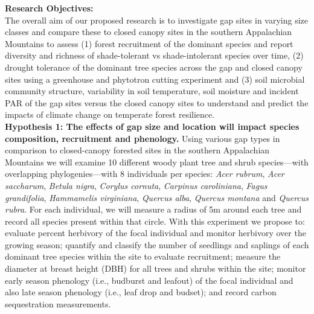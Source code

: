 \documentclass[11pt]{article}\usepackage[]{graphicx}\usepackage[]{color}
\begin{document}
{\noindent\Large\textbf{Research Objectives:}}\\
The overall aim of our proposed research is to investigate gap sites in varying size classes and compare these to closed canopy sites in the southern Appalachian Mountains to assess (1) forest recruitment of the dominant species and report diversity and richness of shade-tolerant vs shade-intolerant species over time, (2) drought tolerance of the dominant tree species across the gap and closed canopy sites using a greenhouse and phytotron cutting experiment and (3) soil microbial community structure, variability in soil temperature, soil moisture and incident PAR of the gap sites versus the closed canopy sites to understand and predict the impacts of climate change on temperate forest resilience.\\

\textbf{Hypothesis 1: The effects of gap size and location will impact species composition, recruitment and phenology.} Using various gap types in comparison to closed-canopy forested sites in the southern Appalachian Mountains we will examine 10 different woody plant tree and shrub species---with overlapping phylogenies---with 8 individuals per species: \textit{Acer rubrum}, \textit{Acer saccharum}, \textit{Betula nigra}, \textit{Corylus cornuta}, \textit{Carpinus caroliniana}, \textit{Fagus grandifolia}, \textit{Hammamelis virginiana}, \textit{Quercus alba}, \textit{Quercus montana} and \textit{Quercus rubra}. For each individual, we will measure a radius of 5m around each tree and record all species present within that circle. With this experiment we propose to: evaluate percent herbivory of the focal individual and monitor herbivory over the growing season; quantify and classify the number of seedlings and saplings of each dominant tree species within the site to evaluate recruitment; measure the diameter at breast height (DBH) for all trees and shrubs within the site; monitor early season phenology (i.e., budburst and leafout) of the focal individual and also late season phenology (i.e., leaf drop and budset); and record carbon sequestration measurements.
  
\end{document}
